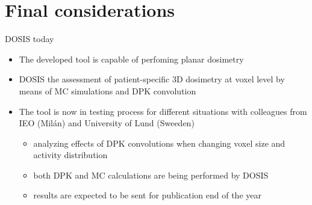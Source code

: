 \documentclass[ignorenonframetext,]{beamer}
\providecommand{\tightlist}{%
  \setlength{\itemsep}{0pt}\setlength{\parskip}{0pt}}
\begin{document}
\hypertarget{final-considerations}{%
\section{Final considerations}\label{final-considerations}}

\begin{frame}{DOSIS today}
\protect\hypertarget{dosis-today}{}

\begin{itemize}
\item
  The developed tool is capable of perfoming planar dosimetry
\item
  DOSIS the assessment of patient-specific 3D dosimetry at voxel level
  by means of MC simulations and DPK convolution
\item
  The tool is now in testing process for different situations with
  colleagues from IEO (Milán) and University of Lund (Sweeden)

  \begin{itemize}
  \tightlist
  \item
    analyzing effects of DPK convolutions when changing voxel size and
    activity distribution
  \item
    both DPK and MC calculations are being performed by DOSIS
  \item
    results are expected to be sent for publication end of the year
  \end{itemize}
\end{itemize}

\end{frame}
\end{document}
